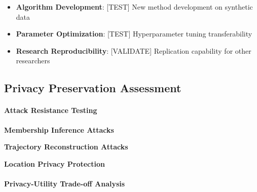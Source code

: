 \documentclass[runningheads]{llncs}
\begin{document}
\begin{itemize}
\item \textbf{Algorithm Development}: [TEST] New method development on synthetic data
\item \textbf{Parameter Optimization}: [TEST] Hyperparameter tuning transferability
\item \textbf{Research Reproducibility}: [VALIDATE] Replication capability for other researchers
\end{itemize}

\subsection{Privacy Preservation Assessment}
\label{sec:privacy-eval}


\paragraph{Attack Resistance Testing}

\textbf{Membership Inference Attacks}

\textbf{Trajectory Reconstruction Attacks}

\textbf{Location Privacy Protection}

\paragraph{Privacy-Utility Trade-off Analysis}
\end{document}
